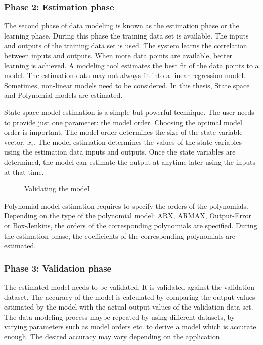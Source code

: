 \documentclass[article,type=msc,colorback,12pt,accentcolor=tud8b,table]{tudthesis}
\begin{document}
 	\subsubsection{Phase 2: Estimation phase}
 	
 	The second phase of data modeling is known as the estimation phase or the learning phase. During this phase the training data set is available. The inputs and outputs of the training data set is used. The system learns the correlation between inputs and outputs. When more data points are available, better learning is achieved. A modeling tool estimates the best fit of the data points to a model. The estimation data may not always fit into a linear regression model. Sometimes, non-linear models need to be considered. In this thesis, State space and Polynomial models are estimated.
 	
 	State space model estimation is a simple but powerful technique. The user needs to provide just one parameter: the model order. Choosing the optimal model order is important. The model order determines the size of the state variable vector, $x_i$. The model estimation determines the values of the state variables using the estimation data inputs and outputs. Once the state variables are determined, the model can estimate the output at anytime later using the inputs at that time.

\begin{figure}[H]
	\begin{center}
	\end{center}
	\caption{Validating the model}
	\label{fig:data_modeling_flowchart}
\end{figure}

Polynomial model estimation requires to specify the orders of the polynomials. Depending on the type of the polynomial model: ARX, ARMAX, Output-Error or Box-Jenkins,  the orders of the corresponding polynomials are specified. During the estimation phase, the coefficients of the corresponding polynomials are estimated.
  
\subsubsection{Phase 3: Validation phase}

The estimated model needs to be validated. It is validated against the validation dataset. The accuracy of the model is calculated by comparing the output values estimated by the model with the actual output values of the validation data set. The data modeling process maybe repeated by using different datasets, by varying parameters such as model orders etc. to derive a model which is accurate enough. The desired accuracy may vary depending on the application.
\end{document}

